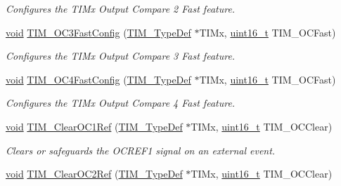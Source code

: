 \begin{DoxyCompactItemize}
\begin{DoxyCompactList}\small\item\em Configures the T\+I\+Mx Output Compare 2 Fast feature. \end{DoxyCompactList}\item 
\hyperlink{usb__devapi_8h_afabf60e7f57651d6d595a02c75f07cd0}{void} \hyperlink{group___t_i_m___private___functions_gab2f3698e6e56bd9b0a4be7056ba789e1}{T\+I\+M\+\_\+\+O\+C3\+Fast\+Config} (\hyperlink{struct_t_i_m___type_def}{T\+I\+M\+\_\+\+Type\+Def} $\ast$T\+I\+Mx, \hyperlink{_p_e___types_8h_a1f1825b69244eb3ad2c7165ddc99c956}{uint16\+\_\+t} T\+I\+M\+\_\+\+O\+C\+Fast)
\begin{DoxyCompactList}\small\item\em Configures the T\+I\+Mx Output Compare 3 Fast feature. \end{DoxyCompactList}\item 
\hyperlink{usb__devapi_8h_afabf60e7f57651d6d595a02c75f07cd0}{void} \hyperlink{group___t_i_m___private___functions_ga58279a04e8ea5333f1079d3cce8dde12}{T\+I\+M\+\_\+\+O\+C4\+Fast\+Config} (\hyperlink{struct_t_i_m___type_def}{T\+I\+M\+\_\+\+Type\+Def} $\ast$T\+I\+Mx, \hyperlink{_p_e___types_8h_a1f1825b69244eb3ad2c7165ddc99c956}{uint16\+\_\+t} T\+I\+M\+\_\+\+O\+C\+Fast)
\begin{DoxyCompactList}\small\item\em Configures the T\+I\+Mx Output Compare 4 Fast feature. \end{DoxyCompactList}\item 
\hyperlink{usb__devapi_8h_afabf60e7f57651d6d595a02c75f07cd0}{void} \hyperlink{group___t_i_m___private___functions_ga34e926cd8a99cfcc7480b2d6de5118b6}{T\+I\+M\+\_\+\+Clear\+O\+C1\+Ref} (\hyperlink{struct_t_i_m___type_def}{T\+I\+M\+\_\+\+Type\+Def} $\ast$T\+I\+Mx, \hyperlink{_p_e___types_8h_a1f1825b69244eb3ad2c7165ddc99c956}{uint16\+\_\+t} T\+I\+M\+\_\+\+O\+C\+Clear)
\begin{DoxyCompactList}\small\item\em Clears or safeguards the O\+C\+R\+E\+F1 signal on an external event. \end{DoxyCompactList}\item 
\hyperlink{usb__devapi_8h_afabf60e7f57651d6d595a02c75f07cd0}{void} \hyperlink{group___t_i_m___private___functions_gac474ebc815d24c8a589969e0c68b27b0}{T\+I\+M\+\_\+\+Clear\+O\+C2\+Ref} (\hyperlink{struct_t_i_m___type_def}{T\+I\+M\+\_\+\+Type\+Def} $\ast$T\+I\+Mx, \hyperlink{_p_e___types_8h_a1f1825b69244eb3ad2c7165ddc99c956}{uint16\+\_\+t} T\+I\+M\+\_\+\+O\+C\+Clear)

\end{DoxyCompactItemize}
